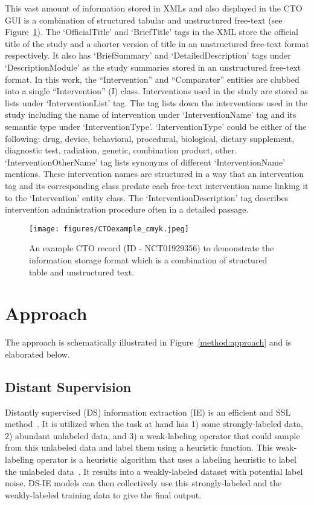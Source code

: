 \documentclass[letterpaper]{article} %
\begin{document}
This vast amount of information stored in XMLs and also displayed in the CTO GUI is a combination of structured tabular and unstructured free-text (see Figure~\ref{fig:CTO_example}).
The `OfficialTitle' and `BriefTitle' tags in the XML store the official title of the study and a shorter version of title in an unstructured free-text format respectively.
It also has `BriefSummary' and `DetailedDescription' tags under `DescriptionModule' as the study summaries stored in an unstructured free-text format.
In this work, the ``Intervention'' and ``Comparator'' entities are clubbed into a single ``Intervention'' (I) class.
Interventions used in the study are stored as lists under `InterventionList' tag.
The tag lists down the interventions used in the study including the name of intervention under `InterventionName' tag and its semantic type under `InterventionType'.
`InterventionType' could be either of the following: drug, device, behavioral, procedural, biological, dietary supplement, diagnostic test, radiation, genetic, combination product, other.
`InterventionOtherName' tag lists synonyms of different `InterventionName' mentions.
These intervention names are structured in a way that an intervention tag and its corresponding class predate each free-text intervention name linking it to the `Intervention' entity class.
The `InterventionDescription' tag describes intervention administration procedure often in a detailed passage.
%
\begin{figure}[t]
\centering
\texttt{[image: figures/CTOexample\_cmyk.jpeg]}
\caption{An example CTO record (ID - NCT01929356) to demonstrate the information storage format which is a combination of structured table and unstructured text.}
\label{fig:CTO_example}
\end{figure}
%
%
%
\section{Approach}
\label{sec:methods}
%
The approach is schematically illustrated in Figure~\ref{method:approach} and is elaborated below.
%
\subsection{Distant Supervision}
\label{subsec:ds}
%
Distantly supervised (DS) information extraction (IE) is an efficient and SSL method~\cite{etzioni2008open,wen2019efficient}.
It is utilized when the task at hand has 1) some strongly-labeled data, 2) abundant unlabeled data, and 3) a weak-labeling operator that could sample from this unlabeled data and label them using a heuristic function.
This weak-labeling operator is a heuristic algorithm that uses a labeling heuristic to label the unlabeled data~\cite{pinto2003table, greaves2014relation}.
It results into a weakly-labeled dataset with potential label noise.
DS-IE models can then collectively use this strongly-labeled and the weakly-labeled training data to give the final output.
%
\end{document}
